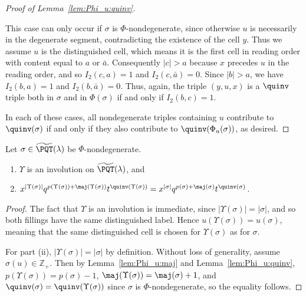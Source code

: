 \begin{proof}[Proof of Lemma~\ref{lem:Phi_u:quinv}]
\begin{flushleft}
\end{flushleft}
This case can only occur if $\sigma$ is $\Phi$-nondegenerate, since otherwise $u$ is necessarily in the degenerate segment, contradicting the existence of the cell $y$. Thus we assume $u$ is the distinguished cell, which means it is the first cell in reading order with content equal to $a$ or $\bar{a}$. Consequently $|c|>a$ because $x$ precedes $u$ in the reading order, and so $I_2(c,a)=1$ and $I_2(c,\bar{a})=0$. Since $|b|>a$, we have $I_2(b,a)=1$ and $I_2(b,\bar{a})=0$. Thus, again, the triple $(y,u,x)$ is a $\quinv$ triple both in $\sigma$ and in $\Phi(\sigma)$ if and only if $I_2(b,c)=1$.

In each of these cases, all nondegenerate triples containing $u$ contribute to $\quinv(\sigma)$ if and only if they also contribute to $\quinv(\Phi_u(\sigma))$, as desired.
\end{proof}

\begin{corollary}\label{cor:nondegenerate}
Let $\sigma\in\widetilde{\PQT}(\lambda)$ be $\Phi$-nondegenerate.
\begin{enumerate}[label=(\roman*)]
\item $\Upsilon$ is an involution on $\widetilde{\PQT}(\lambda)$, and
\item $x^{|\Upsilon(\sigma)|} q^{p(\Upsilon(\sigma))+\maj(\Upsilon(\sigma))}t^{\quinv(\Upsilon(\sigma))} = x^{|\sigma|} q^{p(\sigma)+\maj(\sigma)}t^{\quinv(\sigma)}$.
\end{enumerate}
\end{corollary}

\begin{proof}
The fact that $\Upsilon$ is an involution is immediate, since $|\Upsilon(\sigma)|=|\sigma|$, and so both fillings have the same distinguished label. Hence $u(\Upsilon(\sigma))=u(\sigma)$, meaning that the same distinguished cell is chosen for $\Upsilon(\sigma)$ as for $\sigma$.

For part (ii), $|\Upsilon(\sigma)|=|\sigma|$ by definition. Without loss of generality, assume $\sigma(u)\in\mathbb{Z}_+$. Then by Lemma~\ref{lem:Phi_u:maj} and Lemma~\ref{lem:Phi_u:quinv},  $p(\Upsilon(\sigma))=p(\sigma)-1$, $\maj(\Upsilon(\sigma)) = \maj(\sigma)+1$, and $\quinv(\sigma)=\quinv(\Upsilon(\sigma))$ since $\sigma$ is $\Phi$-nondegenerate, so the equality follows.
\end{proof}

